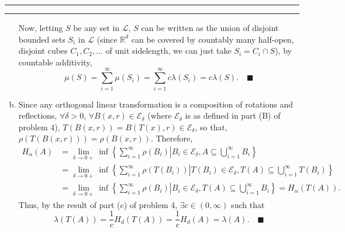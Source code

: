 \documentclass[11pt]{article}
\newcounter{questionCounter}
\newcounter{partCounter}[questionCounter]
\newenvironment{question}[2][\arabic{questionCounter}]{%
    \setcounter{partCounter}{0}%
    \vspace{.25in} \hrule \vspace{0.5em}%
        \noindent{\bf #2}%
    \vspace{0.8em} \hrule \vspace{.10in}%
    \addtocounter{questionCounter}{1}%
}{}
\newcommand{\mqed}{\quad \blacksquare}
\begin{document}
\begin{question}{Problem 3}
\begin{enumerate}[(a)]
Now, letting $S$ be any set in $\mathcal{L}$, $S$ can be written as the union
of disjoint bounded sets $S_i$ in $\mathcal{L}$ (since $\mathbb{R}^d$ can be
covered by countably many half-open, disjoint cubes $C_1,C_2,\ldots$ of unit
sidelength, we can just take $S_i = C_i \cap S$), by countable additivity,
\[\mu(S)
 = \sum_{i = 1}^{\infty} \mu(S_i)
 = \sum_{i = 1}^{\infty} c\lambda(S_i)
 = c\lambda(S).\mqed\]

\item Since any orthogonal linear transformation is a composition of rotations
and reflections, $\forall \delta > 0$,
$\forall B(x,r) \in \mathcal{E}_{\delta}$ (where $\mathcal{E}_{\delta}$ is as
defined in part (B) of problem 4),
$T(B(x,r)) = B(T(x),r) \in \mathcal{E}_{\delta}$, so that,
$\rho(T(B(x,r))) = \rho(B(x,r))$.
Therefore,
\begin{align*}
H_{\alpha}(A)
 & = \lim_{\delta \rightarrow 0+} \inf
        \left\{\sum_{i = 1}^{\infty} \rho(B_i) \right|
        \left.B_i \in \mathcal{E}_{\delta},
            A \subseteq \bigcup_{i = 1}^{\infty} B_i \right\}       \\
 & = \lim_{\delta \rightarrow 0+} \inf
        \left\{\sum_{i = 1}^{\infty} \rho(T(B_i)) \right|
        \left.T(B_i) \in \mathcal{E}_{\delta},
            T(A) \subseteq \bigcup_{i = 1}^{\infty} T(B_i) \right\} \\
 & = \lim_{\delta \rightarrow 0+} \inf
        \left\{\sum_{i = 1}^{\infty} \rho(B_i) \right|
        \left.B_i \in \mathcal{E}_{\delta},
            T(A) \subseteq \bigcup_{i = 1}^{\infty} B_i \right\}
   = H_{\alpha}(T(A)).
\end{align*}
Thus, by the result of part (c) of problem 4, $\exists c \in (0,\infty)$ such
that
\[\lambda(T(A))
 = \frac{1}{c}H_d(T(A))
 = \frac{1}{c}H_d(A)
 = \lambda(A). \mqed\]
\end{enumerate}
\end{question}
\end{document}
